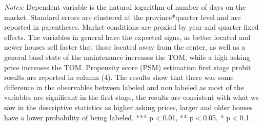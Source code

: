 \documentclass[12pt]{article}
\begin{document}
\begin{table}[H]
\begin{tabular}{lcccc}
\hline

    \end{tabular}%
\begin{tablenotes}
\scriptsize
\item \textit{Notes:} Dependent variable is the natural logarithm of number of days on the market. Standard errors are clustered at the province*quarter level and are reported in parentheses.  Market conditions are proxied by year and quarter fixed effects. The variables in general have the expected signs, as better located and newer houses sell faster that those located away from the center, as well as a general basd state of the maintenance increases the TOM, while a high asking price increases the TOM. Propensity score (PSM) estimation first stage probit results are reported in column (4). The results show that there was some difference in the observables between labeled and non labeled as most of the variables are significant in the first stage, the results are consistent with what we saw in the descriptive statistics as higher asking prices, larger and older houses have a lower probability of being labeled. *** p$<$0.01, ** p$<$0.05, * p$<$0.1.
\end{tablenotes}

  \label{tab:addlabel}%
\end{table}%






\newpage
\end{document}
